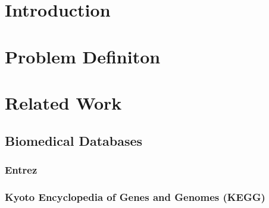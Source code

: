 \chapter{Introduction}

\chapter{Problem Definiton}


\chapter{Related Work}

\section{Biomedical Databases}



\subsection{Entrez}


\subsection{Kyoto Encyclopedia of Genes and Genomes (KEGG)}


